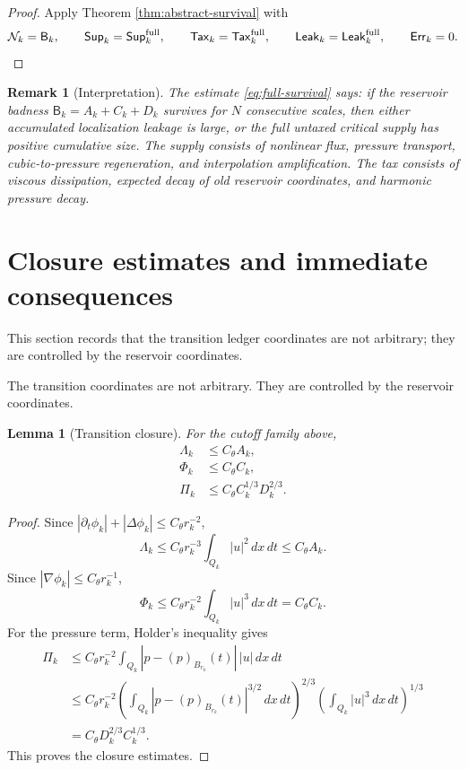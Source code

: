 \documentclass[11pt]{article}
\numberwithin{equation}{section}
\newtheorem{lemma}[theorem]{Lemma}
\newtheorem{remark}[theorem]{Remark}
\newcommand{\Supp}{\mathsf{Sup}}
\newcommand{\Tax}{\mathsf{Tax}}
\newcommand{\Leak}{\mathsf{Leak}}
\newcommand{\Err}{\mathsf{Err}}
\newcommand{\Bbad}{\mathsf B}
\newcommand{\dd}{\,d}
\newcommand{\N}{\mathcal N}
\begin{document}
\begin{proof}
Apply Theorem \ref{thm:abstract-survival} with
\[
\N_k=\Bbad_k,
\qquad
\Supp_k=\Supp_k^{\rm full},
\qquad
\Tax_k=\Tax_k^{\rm full},
\qquad
\Leak_k=\Leak_k^{\rm full},
\qquad
\Err_k=0.
\]
\end{proof}

\begin{remark}[Interpretation]
The estimate \eqref{eq:full-survival} says: if the reservoir badness $\Bbad_k=A_k+C_k+D_k$ survives for $N$ consecutive scales, then either accumulated localization leakage is large, or the full untaxed critical supply has positive cumulative size.  The supply consists of nonlinear flux, pressure transport, cubic-to-pressure regeneration, and interpolation amplification.  The tax consists of viscous dissipation, expected decay of old reservoir coordinates, and harmonic pressure decay.
\end{remark}

\section{Closure estimates and immediate consequences}\label{sec:closure-consequences}
\noindent This section records that the transition ledger coordinates are not arbitrary; they are controlled by the reservoir coordinates.

The transition coordinates are not arbitrary.  They are controlled by the reservoir coordinates.

\begin{lemma}[Transition closure]\label{lem:transition-closure}
For the cutoff family above,
\begin{align}
\Lambda_k&\leq C_\theta A_k,\label{eq:Lambda-closure}\\
\Phi_k&\leq C_\theta C_k,\label{eq:Phi-closure}\\
\Pi_k&\leq C_\theta C_k^{1/3}D_k^{2/3}.\label{eq:Pi-closure}
\end{align}
\end{lemma}

\begin{proof}
Since $|\partial_t\phi_k|+|\Delta\phi_k|\leq C_\theta r_k^{-2}$,
\[
\Lambda_k
\leq C_\theta r_k^{-3}\int_{Q_k}|u|^2\dd x\dd t
\leq C_\theta A_k.
\]
Since $|\nabla\phi_k|\leq C_\theta r_k^{-1}$,
\[
\Phi_k
\leq C_\theta r_k^{-2}\int_{Q_k}|u|^3\dd x\dd t
=C_\theta C_k.
\]
For the pressure term, Holder's inequality gives
\begin{align*}
\Pi_k
&\leq C_\theta r_k^{-2}\int_{Q_k}|p-(p)_{B_{r_k}}(t)|\,|u|\dd x\dd t\\
&\leq C_\theta r_k^{-2}
\left(\int_{Q_k}|p-(p)_{B_{r_k}}(t)|^{3/2}\dd x\dd t\right)^{2/3}
\left(\int_{Q_k}|u|^3\dd x\dd t\right)^{1/3}\\
&=C_\theta D_k^{2/3}C_k^{1/3}.
\end{align*}
This proves the closure estimates.
\end{proof}
\end{document}
